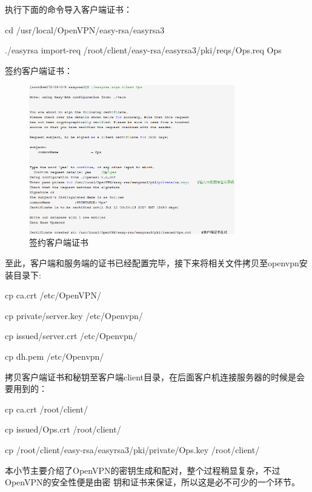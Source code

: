 \documentclass[a4paper,12pt]{report}
\begin{document}
\begin{spacing}{1.5}
执行下面的命令导入客户端证书：

\begin{tcolorbox}[notitle,boxrule=0pt,colback=gray!20,colframe=gray!20]
cd /usr/local/OpenVPN/easy-rsa/easyrsa3

./easyrsa import-req  /root/client/easy-rsa/easyrsa3/pki/reqs/Ops.req Ops
\end{tcolorbox}

签约客户端证书：
\begin{figure}[H]
	\centering
	\includegraphics [width=0.8\textwidth]{figure//sign-client-ca.png}
	\caption{签约客户端证书}\label{sign-client-ca}
\end{figure}

至此，客户端和服务端的证书已经配置完毕，接下来将相关文件拷贝至openvpn安装目录下:

\begin{tcolorbox}[notitle,boxrule=0pt,colback=gray!20,colframe=gray!20]
cp ca.crt /etc/OpenVPN/

cp private/server.key /etc/Openvpn/

cp issued/server.crt /etc/Openvpn/

cp dh.pem /etc/Openvpn/
\end{tcolorbox}

拷贝客户端证书和秘钥至客户端client目录，在后面客户机连接服务器的时候是会要用到的：

\begin{tcolorbox}[notitle,boxrule=0pt,colback=gray!20,colframe=gray!20]
cp ca.crt /root/client/

cp issued/Ops.crt /root/client/

cp /root/client/easy-rsa/easyrsa3/pki/private/Ops.key /root/client/
\end{tcolorbox}

本小节主要介绍了OpenVPN的密钥生成和配对，整个过程稍显复杂，不过OpenVPN的安全性便是由密
钥和证书来保证，所以这是必不可少的一个环节。


\end{spacing}
\end{document}
